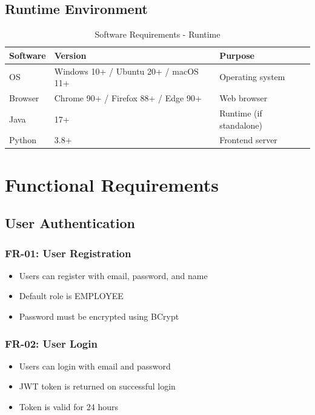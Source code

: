 \documentclass[12pt,a4paper,twoside]{book}
\begin{document}
\subsection{Runtime Environment}

\begin{table}[H]
\centering
\begin{tabular}{|l|l|l|}
\hline
\textbf{Software} & \textbf{Version} & \textbf{Purpose} \\ \hline
OS & Windows 10+ / Ubuntu 20+ / macOS 11+ & Operating system \\ \hline
Browser & Chrome 90+ / Firefox 88+ / Edge 90+ & Web browser \\ \hline
Java & 17+ & Runtime (if standalone) \\ \hline
Python & 3.8+ & Frontend server \\ \hline
\end{tabular}
\caption{Software Requirements - Runtime}
\end{table}

\section{Functional Requirements}

\subsection{User Authentication}

\subsubsection{FR-01: User Registration}
\begin{itemize}
    \item Users can register with email, password, and name
    \item Default role is EMPLOYEE
    \item Password must be encrypted using BCrypt
\end{itemize}

\subsubsection{FR-02: User Login}
\begin{itemize}
    \item Users can login with email and password
    \item JWT token is returned on successful login
    \item Token is valid for 24 hours
\end{itemize}
\end{document}
